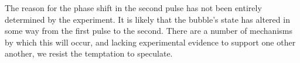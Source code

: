 The reason for the phase shift in the second pulse has not been entirely determined
by the experiment.  It is likely that the bubble's state has altered 
in some way from the first pulse to the second.
There are a number of mechanisms by which this will occur,
and lacking experimental evidence to support one other another,
we resist the temptation to speculate.



\clearpage














